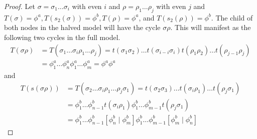 \begin{proof}
    Let $\sigma = \sigma_1 \dots \sigma_i$ with even $i$ and $\rho = \rho_1 \dots \rho_j$ with even $j$ and $T(\sigma) = \phi^a, T(s_2(\sigma)) = \phi^b, T(\rho) = \phi^a$, and $T(s_2(\rho)) = \phi^b$.
    The child of both nodes in the halved model will have the cycle $\sigma\rho$.
    This will manifest as the following two cycles in the full model.
    \begin{align*}
        T(\sigma\rho) & = T(\sigma_1 \dots \sigma_i \rho_1 \dots \rho_j) = t(\sigma_1\sigma_2) \dots t(\sigma_{i-i}\sigma_i) t(\rho_1\rho_2) \dots t(\rho_{j-1}\rho_j) \\
                      & = \phi^a_1 \dots \phi^a_n \phi^a_1 \dots \phi^a_m = \phi^a\phi^a
    \end{align*}
    and
    \begin{align*}
        T(s(\sigma\rho)) & = T(\sigma_2 \dots \sigma_i \rho_1 \dots \rho_j \sigma_1) = t(\sigma_2\sigma_3) \dots t(\sigma_i\rho_1) \dots t(\rho_j\sigma_1)   \\
                         & = \phi^b_1 \dots \phi^b_{n-1} t(\sigma_i\rho_1) \phi^b_1 \dots \phi^b_{m-1} t(\rho_j\sigma_1)                                     \\
                         & = \phi^b_1 \dots \phi^b_{n-1} \left[\phi^b_n \mid \phi^b_m\right] \phi^b_1 \dots \phi^b_{m-1} \left[\phi^b_m \mid \phi^b_n\right]
    \end{align*}
\end{proof}
